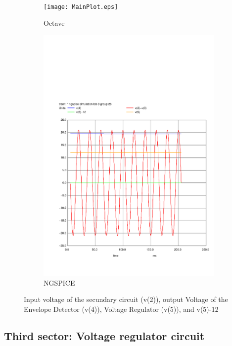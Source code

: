 \begin{figure}[H] 
\centering
\begin{subfigure}{0.4\textwidth}
\texttt{[image: MainPlot.eps]}
\caption{Octave}
\label{fig:first}
\end{subfigure}
\begin{subfigure}{0.3\textwidth}
\includegraphics[width=\textwidth]{sim3.pdf}
\caption{NGSPICE}
\label{fig:second}
\end{subfigure}
\caption{Input voltage of the secundary circuit (v(2)), output Voltage of the Envelope Detector (v(4)), Voltage
Regulator (v(5)), and v(5)-12}
\end{figure}

\subsection{Third sector: Voltage regulator circuit}

